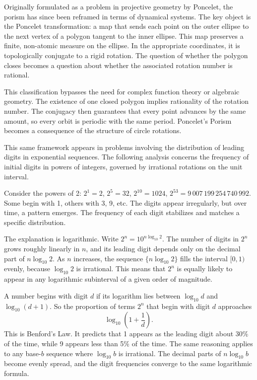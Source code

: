 Originally formulated as a problem in projective geometry by Poncelet, the porism has since been reframed in terms of dynamical systems. The key object is the Poncelet transformation: a map that sends each point on the outer ellipse to the next vertex of a polygon tangent to the inner ellipse. This map preserves a finite, non-atomic measure on the ellipse. In the appropriate coordinates, it is topologically conjugate to a rigid rotation. The question of whether the polygon closes becomes a question about whether the associated rotation number is rational.

This classification bypasses the need for complex function theory or algebraic geometry. The existence of one closed polygon implies rationality of the rotation number. The conjugacy then guarantees that every point advances by the same amount, so every orbit is periodic with the same period. Poncelet’s Porism becomes a consequence of the structure of circle rotations.

This same framework appears in problems involving the distribution of leading digits in exponential sequences. The following analysis concerns the frequency of initial digits in powers of integers, governed by irrational rotations on the unit interval.

Consider the powers of 2: $2^1 = 2$, $2^5 = 32$, $2^{10} = 1024$, $2^{53} = 9{\,}007{\,}199{\,}254{\,}740{\,}992$. Some begin with 1, others with 3, 9, etc. The digits appear irregularly, but over time, a pattern emerges. The frequency of each digit stabilizes and matches a specific distribution.

The explanation is logarithmic. Write $2^n = 10^{n \log_{10} 2}$. The number of digits in $2^n$ grows roughly linearly in $n$, and its leading digit depends only on the decimal part of $n \log_{10} 2$. As $n$ increases, the sequence $\{ n \log_{10} 2 \}$ fills the interval $[0,1)$ evenly, because $\log_{10} 2$ is irrational. This means that $2^n$ is equally likely to appear in any logarithmic subinterval of a given order of magnitude.

A number begins with digit $d$ if its logarithm lies between $\log_{10} d$ and $\log_{10}(d+1)$. So the proportion of terms $2^n$ that begin with digit $d$ approaches
\[
\log_{10}\left(1 + \frac{1}{d}\right).
\]
This is Benford’s Law. It predicts that 1 appears as the leading digit about 30\% of the time, while 9 appears less than 5\% of the time. The same reasoning applies to any base-$b$ sequence where $\log_{10} b$ is irrational. The decimal parts of $n \log_{10} b$ become evenly spread, and the digit frequencies converge to the same logarithmic formula.

